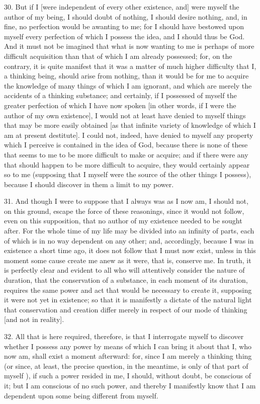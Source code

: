 30. But if I [were independent of every other existence, and] were myself the author of my being, I should doubt of nothing, I should desire nothing, and, in fine, no perfection would be awanting to me; for I should have bestowed upon myself every perfection of which I possess the idea, and I should thus be God. And it must not be imagined that what is now wanting to me is perhaps of more difficult acquisition than that of which I am already possessed; for, on the contrary, it is quite manifest that it was a matter of much higher difficulty that I, a thinking being, should arise from nothing, than it would be for me to acquire the knowledge of many things of which I am ignorant, and which are merely the accidents of a thinking substance; and certainly, if I possessed of myself the greater perfection of which I have now spoken [in other words, if I were the author of my own existence], I would not at least have denied to myself things that may be more easily obtained [as that infinite variety of knowledge of which I am at present destitute]. I could not, indeed, have denied to myself any property which I perceive is contained in the idea of God, because there is none of these that seems to me to be more difficult to make or acquire; and if there were any that should happen to be more difficult to acquire, they would certainly appear so to me (supposing that I myself were the source of the other things I possess), because I should discover in them a limit to my power.

31. And though I were to suppose that I always was as I now am, I should not, on this ground, escape the force of these reasonings, since it would not follow, even on this supposition, that no author of my existence needed to be sought after. For the whole time of my life may be divided into an infinity of parts, each of which is in no way dependent on any other; and, accordingly, because I was in existence a short time ago, it does not follow that I must now exist, unless in this moment some cause create me anew as it were, that is, conserve me. In truth, it is perfectly clear and evident to all who will attentively consider the nature of duration, that the conservation of a substance, in each moment of its duration, requires the same power and act that would be necessary to create it, supposing it were not yet in existence; so that it is manifestly a dictate of the natural light that conservation and creation differ merely in respect of our mode of thinking [and not in reality].

32. All that is here required, therefore, is that I interrogate myself to discover whether I possess any power by means of which I can bring it about that I, who now am, shall exist a moment afterward: for, since I am merely a thinking thing (or since, at least, the precise question, in the meantime, is only of that part of myself ), if such a power resided in me, I should, without doubt, be conscious of it; but I am conscious of no such power, and thereby I manifestly know that I am dependent upon some being different from myself.

